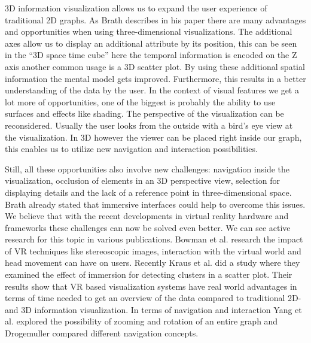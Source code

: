 3D information visualization allows us to expand the user experience of traditional 2D graphs. As Brath describes in his paper \cite{brath_3d_2014} there are many advantages and opportunities when using three-dimensional visualizations.
The additional axes allow us to display an additional attribute by its position, this can be seen in the “3D space time cube” \cite{brath_3d_2014} here the temporal information is encoded on the Z axis another common usage is a 3D scatter plot. By using these additional spatial information the mental model gets improved. Furthermore, this results in a better understanding of the data by the user.
In the context of visual features we get a lot more of opportunities, one of the biggest is probably the ability to use surfaces and effects like shading. 
The perspective of the visualization can be reconsidered. Usually the user looks from the outside with a
bird's eye view at the visualization. In 3D however the viewer can be placed right inside our graph, this enables us to utilize new navigation and interaction possibilities. 

Still, all these opportunities also involve new challenges: navigation inside the visualization, occlusion of elements in an 3D perspective view, selection for displaying details and the lack of a reference point in three-dimensional space. Brath \cite{brath_3d_2014} already stated that immersive interfaces could help to overcome this issues.
 We believe that with the recent developments in virtual reality hardware and frameworks these challenges can now be solved even better. 
 We can see active research for this topic in various publications. Bowman et al. \cite{bowman_virtual_2007} research the impact of VR techniques like stereoscopic images, interaction with the virtual world and head movement can have on users. 
 Recently Kraus et al. \cite{kraus_impact_2020} did a study where they examined the effect of immersion for detecting clusters in a scatter plot. Their results show that VR based visualization systems have real world advantages in terms of time needed to get an overview of the data compared to traditional 2D- and 3D information visualization. In terms of navigation and interaction Yang et al. \cite{yang_embodied_2020} explored the possibility of zooming and rotation of an entire graph and Drogemuller \cite{drogemuller_examining_2020} compared different navigation concepts.
 
